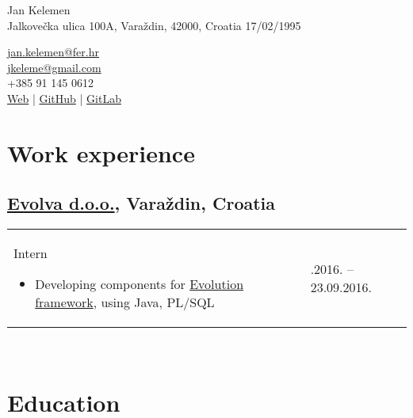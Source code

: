 \documentclass[a4paper]{article}
\makeatletter
\newlength{\tablewidth}
\newenvironment{period}[2]{%
\newcommand{\sarma}{#2}%
\setlength{\tablewidth}{\linewidth}
\addtolength{\tablewidth}{-2\tabcolsep}
\begin{tabular}{@{}p{0.75\tablewidth}>{\raggedleft\arraybackslash}p{0.25\tablewidth}@{}}%
#1 \newline
\begin{itemize}
}{%
\end{itemize} & \sarma \\%
\end{tabular}\\
}
\makeatother
\begin{document}
\fontfamily{\sfdefault}
\selectfont

\begin{minipage}{.5\textwidth}
\LARGE{Jan Kelemen}\\
\normalsize{Jalkove\v{c}ka ulica 100A, Vara\v{z}din, 42000, Croatia}
\normalsize{17/02/1995}
\end{minipage}%
\begin{minipage}{.5\textwidth}
\raggedleft
\href{mailto:jan.kelemen@fer.hr}{jan.kelemen@fer.hr} \\
\href{mailto:jkeleme@gmail.com}{jkeleme@gmail.com} \\
+385 91 145 0612 \\
\href{http://jan-kelemen.github.io/}{Web} | \href{https://github.com/jan-kelemen}{GitHub} | \href{https://gitlab.com/jan-kelemen}{GitLab}
\end{minipage}

\vspace{1em}

\section{Work experience}
\subsection{\href{http://www.evolva.hr/hr/index.html}{Evolva d.o.o.}, Vara\v{z}din, Croatia}
\begin{period}{Intern}{22.08.2016. -- 23.09.2016.}
	\item
		Developing components for \href{http://www.evolution-framework.com/}{Evolution framework}, using Java, PL/SQL
\end{period}

\section{Education}
\end{document}
